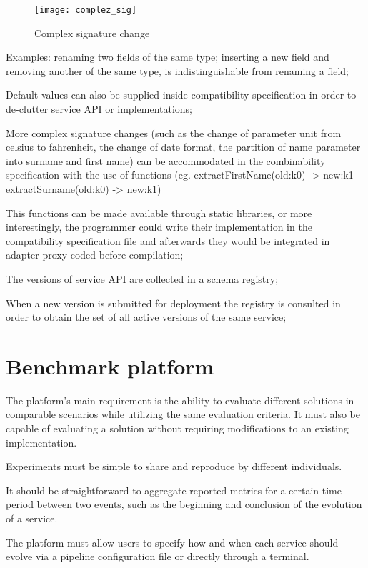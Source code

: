 \begin{figure}[htbp]
    \centering
    \texttt{[image: complez\_sig]}
    \caption{Complex signature change}
    \label{fig:complex}
\end{figure}

Examples:
renaming two fields of the same type;
inserting a new field and removing another of the same type, is indistinguishable from renaming a field;

Default values can also be supplied inside compatibility specification in order to de-clutter service API or implementations;

More complex signature changes (such as the change of parameter unit from celsius to fahrenheit, the change of date format, the partition of name parameter into surname and first name)
can be accommodated in the combinability specification with the use of functions (eg. extractFirstName(old:k0) -> new:k1  extractSurname(old:k0) -> new:k1)

This functions can be made available through static libraries, or more interestingly, the programmer could write their implementation in the compatibility specification file
and afterwards they would be integrated in adapter proxy coded before compilation;

The versions of service API are collected in a schema registry;

When a new version is submitted for deployment the registry is consulted in order to obtain the set of all active versions of the same service;

\section{Benchmark platform} %
\label{sec:benchmark_platform}

The platform's main requirement is the ability to evaluate different solutions in comparable scenarios while utilizing the same evaluation criteria. It must also be capable of evaluating a solution without requiring modifications to an existing implementation.

Experiments must be simple to share and reproduce by different individuals.

It should be straightforward to aggregate reported metrics for a certain time period between two events, such as the beginning and conclusion of the evolution of a service.

The platform must allow users to specify how and when each service should evolve via a pipeline configuration file or directly through a terminal.


